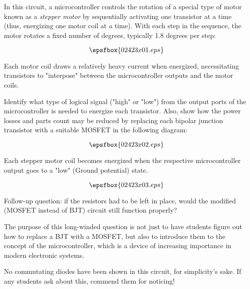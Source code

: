 

In this circuit, a microcontroller controls the rotation of a special type of motor known as a {\it stepper motor} by sequentially activating one transistor at a time (thus, energizing one motor coil at a time).  With each step in the sequence, the motor rotates a fixed number of degrees, typically 1.8 degrees per step:

$$\epsfbox{02423x01.eps}$$

Each motor coil draws a relatively heavy current when energized, necessitating transistors to "interpose" between the microcontroller outputs and the motor coils.

Identify what type of logical signal ("high" or "low") from the output ports of the microcontroller is needed to energize each transistor.  Also, show how the power losses and parts count may be reduced by replacing each bipolar junction transistor with a suitable MOSFET in the following diagram:

$$\epsfbox{02423x02.eps}$$







Each stepper motor coil becomes energized when the respective microcontroller output goes to a "low" (Ground potential) state.

$$\epsfbox{02423x03.eps}$$

\vskip 10pt

Follow-up question: if the resistors had to be left in place, would the modified (MOSFET instead of BJT) circuit still function properly?







The purpose of this long-winded question is not just to have students figure out how to replace a BJT with a MOSFET, but also to introduce them to the concept of the microcontroller, which is a device of increasing importance in modern electronic systems.

No commutating diodes have been shown in this circuit, for simplicity's sake.  If any students ask about this, commend them for noticing!




